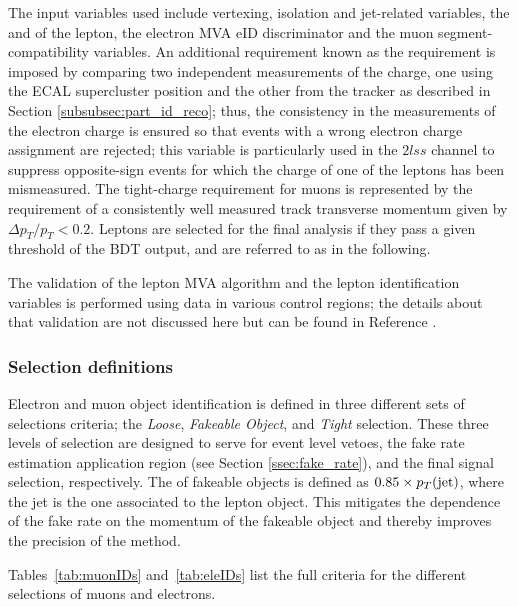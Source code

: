 The input variables used include vertexing, isolation and jet-related variables, the \pt and \etac of the lepton, the electron MVA eID discriminator and the muon segment-compatibility variables. An additional requirement known as the  requirement is imposed by comparing two independent measurements of the charge, one using the ECAL supercluster position and the other from the tracker as described in Section \ref{subsubsec:part_id_reco}; thus, the consistency in the measurements of the electron charge is ensured so that events with a wrong electron charge assignment are rejected; this variable is particularly used in the $2lss$ channel to suppress opposite-sign events for which the charge of one of the leptons has been mismeasured. The tight-charge requirement for muons is represented by the requirement of a consistently well measured track transverse momentum given by $\Delta p_T/p_T < 0.2$.          
Leptons are selected for the final analysis if they pass a given threshold of the BDT output, and are referred to as  in the following.          

The validation of the lepton MVA algorithm and the lepton identification variables is performed using data in various control regions; the details about that validation are not discussed here but can be found in Reference \cite{CMS_AN_2017-029}. 

\subsubsection*{Selection definitions}

Electron and muon object identification is defined in three different sets of selections criteria; the \emph{Loose}, \emph{Fakeable Object}, and \emph{Tight} selection. These three levels of selection are designed to serve for event level vetoes, the fake rate estimation application region (see Section \ref{ssec:fake_rate}), and the final signal selection, respectively. The \pt of fakeable objects is defined as $0.85\times p_T(\mathrm{jet})$, where the jet is the one associated to the lepton object. This mitigates the dependence of the fake rate on the momentum of the fakeable object and thereby improves the precision of the method. 

Tables~\ref{tab:muonIDs} and~\ref{tab:eleIDs} list the full criteria for the different selections of muons and electrons.


